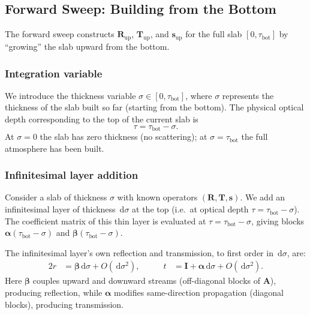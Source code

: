 \documentclass[11pt,a4paper]{article}
\newcommand{\vect}[1]{\bm{#1}}
\newcommand{\mat}[1]{\mathbf{#1}}
\newcommand{\tbot}{\tau_{\mathrm{bot}}}
\newcommand{\dd}{\,\mathrm{d}}
\theoremstyle{definition}
\begin{document}
\subsection{Forward Sweep: Building from the Bottom}\label{sec:forward}

The forward sweep constructs $\mat{R}_{\mathrm{up}}$,
$\mat{T}_{\mathrm{up}}$, and $\vect{s}_{\mathrm{up}}$ for the full slab
$[0, \tbot]$ by ``growing'' the slab upward from the bottom.

\subsubsection{Integration variable}

We introduce the thickness variable $\sigma \in [0, \tbot]$, where
$\sigma$ represents the thickness of the slab built so far (starting
from the bottom).  The physical optical depth corresponding to the
top of the current slab is
\begin{equation}\label{eq:tau-sigma-fwd}
  \tau = \tbot - \sigma.
\end{equation}
At $\sigma = 0$ the slab has zero thickness (no scattering); at
$\sigma = \tbot$ the full atmosphere has been built.

\subsubsection{Infinitesimal layer addition}

Consider a slab of thickness $\sigma$ with known operators
$(\mat{R}, \mat{T}, \vect{s})$.  We add an infinitesimal layer of
thickness $\dd\sigma$ at the top (i.e.\ at optical depth
$\tau = \tbot - \sigma$).  The coefficient matrix of this thin layer
is evaluated at $\tau = \tbot - \sigma$, giving blocks
$\mat{\alpha}(\tbot - \sigma)$ and $\mat{\beta}(\tbot - \sigma)$.

The infinitesimal layer's own reflection and transmission, to first
order in $\dd\sigma$, are:
\begin{alignat}{2}
  r &= \mat{\beta}\dd\sigma + O(\dd\sigma^2),
  &\qquad
  t &= \mat{I} + \mat{\alpha}\dd\sigma + O(\dd\sigma^2).
  \label{eq:inf-layer}
\end{alignat}
Here $\mat{\beta}$ couples upward and downward streams (off-diagonal
blocks of $\mat{A}$), producing reflection, while $\mat{\alpha}$
modifies same-direction propagation (diagonal blocks), producing
transmission.
\end{document}
